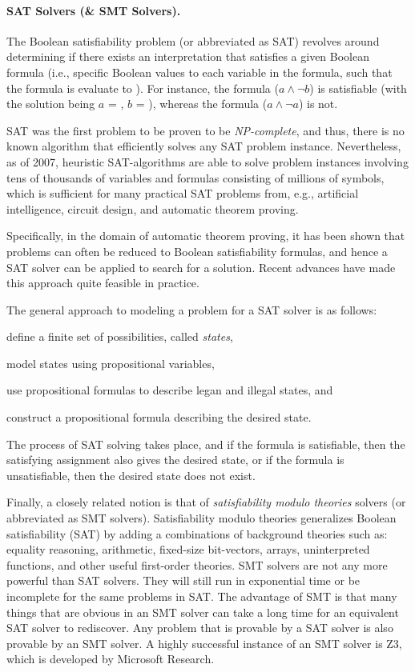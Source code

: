 \paragraph{SAT Solvers (\& SMT Solvers).}
The Boolean satisfiability problem (or abbreviated as SAT) revolves around determining if there exists an interpretation that satisfies a given Boolean formula (i.e., specific Boolean values to each variable in the formula, such that the formula is evaluate to ). For instance, the formula ($a \land \neg b$) is satisfiable (with the solution being $a$ = , $b$ = ), whereas the formula ($a \land \neg a$) is not.

SAT was the first problem to be proven to be \emph{NP-complete}, and thus, there is no known algorithm that efficiently solves any SAT problem instance. Nevertheless, as of 2007, heuristic SAT-algorithms are able to solve problem instances involving tens of thousands of variables and formulas consisting of millions of symbols, which is sufficient for many practical SAT problems from, e.g., artificial intelligence, circuit design, and automatic theorem proving.

Specifically, in the domain of automatic theorem proving, it has been shown that problems can often be reduced to Boolean satisfiability formulas, and hence a SAT solver can be applied to search for a solution. Recent advances have made this approach quite feasible in practice.

The general approach to modeling a problem for a SAT solver is as follows:
\begin{inparaenum}[(1)]
\item define a finite set of possibilities, called \emph{states},
\item model states using propositional variables,
\item use propositional formulas to describe legan and illegal states, and
\item construct a propositional formula describing the desired state.
\end{inparaenum}
The process of SAT solving takes place, and if the formula is satisfiable, then the satisfying assignment also gives the desired state, or if the formula is unsatisfiable, then the desired state does not exist.

Finally, a closely related notion is that of \emph{satisfiability modulo theories} solvers (or abbreviated as SMT solvers). Satisfiability modulo theories generalizes Boolean satisfiability (SAT) by adding a combinations of background theories such as: equality reasoning, arithmetic, fixed-size bit-vectors, arrays, uninterpreted functions, and other useful first-order theories. SMT solvers are not any more powerful than SAT solvers. They will still run in exponential time or be incomplete for the same problems in SAT. The advantage of SMT is that many things that are obvious in an SMT solver can take a long time for an equivalent SAT solver to rediscover. Any problem that is provable by a SAT solver is also provable by an SMT solver. A highly successful instance of an SMT solver is Z3, which is developed by Microsoft Research.


